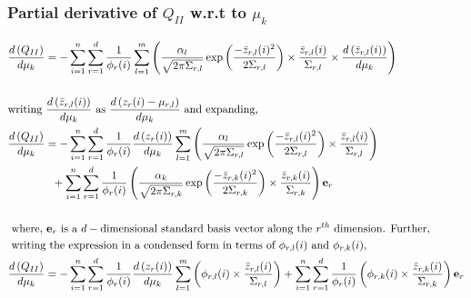 \documentclass[]{article}
\begin{document}
\subsubsection*{Partial derivative of $Q_{II}$ w.r.t to $\mu_k$ }
\begin{align*}
& \der{\mu_k}{Q_{II}}=-\sum\limits_{i=1}^n \sum\limits_{r=1}^{d}\frac{1}{\phi_r(i)} \sum\limits_{l=1}^{m} \left( \frac{\alpha_l}{\sqrt{2\pi\Sigma_{r,l}}} \exp\left( \frac{-\bar{z}_{r,l}(i)^2}{2\Sigma_{r,l}}\right) \times \frac{\bar{z}_{r,l}(i)}{\Sigma_{r,l}}\times \der{\mu_k}{\bar{z}_{r,l}(i)}\right) \\ \\
&\text{writing } \der{\mu_k}{\bar{z}_{r,l}(i)} \text{ as } \der{\mu_k}{z_r(i) -\mu_{r,l}} \text{ and expanding, } \\
& \der{\mu_k}{Q_{II}}=-\sum\limits_{i=1}^n \sum\limits_{r=1}^{d}\frac{1}{\phi_r(i)} \der{\mu_k}{z_r(i)}\sum\limits_{l=1}^{m} \left( \frac{\alpha_l}{\sqrt{2\pi\Sigma_{r,l}}} \exp\left( \frac{-\bar{z}_{r,l}(i)^2}{2\Sigma_{r,l}}\right) \times \frac{\bar{z}_{r,l}(i)}{\Sigma_{r,l}} \right)  \\ 
& \qquad \qquad + \sum\limits_{i=1}^n \sum\limits_{r=1}^{d}\frac{1}{\phi_r(i)}  \left( \frac{\alpha_k}{\sqrt{2\pi\Sigma_{r,k}}} \exp\left( \frac{-\bar{z}_{r,k}(i)^2}{2\Sigma_{r,k}}\right) \times \frac{\bar{z}_{r,k}(i)}{\Sigma_{r,k}} \right) \textbf{e}_r \\
\nonumber \\ 
& \text{ where, } \textbf{e}_r \text{ is a } d- \text{dimensional standard basis vector along the } r^{th} \text{ dimension. Further,} \\
&\text{ writing the expression in a condensed form in terms of } \phi_{r,l}(i) \text{ and } \phi_{r,k}(i), \\
& \der{\mu_k}{Q_{II}}=-\sum\limits_{i=1}^n \sum\limits_{r=1}^{d}\frac{1}{\phi_r(i)} \der{\mu_k}{z_r(i)}\sum\limits_{l=1}^{m} \left( \phi_{r,l}(i) \times \frac{\bar{z}_{r,l}(i)}{\Sigma_{r,l}} \right) + \sum\limits_{i=1}^n \sum\limits_{r=1}^{d}\frac{1}{\phi_r(i)}  \left( \phi_{r,k}(i) \times \frac{\bar{z}_{r,k}(i)} {\Sigma_{r,k}} \right) \textbf{e}_r
\end{align*}
\\
\end{document}
